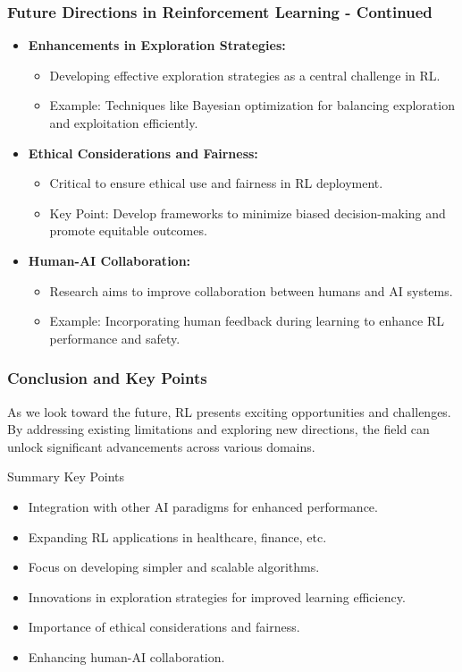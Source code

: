 \documentclass[aspectratio=169]{beamer}
\begin{document}
\begin{frame}[fragile]
    \frametitle{Future Directions in Reinforcement Learning - Continued}
    \begin{itemize}
        \item \textbf{Enhancements in Exploration Strategies:}
        \begin{itemize}
            \item Developing effective exploration strategies as a central challenge in RL.
            \item Example: Techniques like Bayesian optimization for balancing exploration and exploitation efficiently.
        \end{itemize}

        \item \textbf{Ethical Considerations and Fairness:}
        \begin{itemize}
            \item Critical to ensure ethical use and fairness in RL deployment.
            \item Key Point: Develop frameworks to minimize biased decision-making and promote equitable outcomes.
        \end{itemize}

        \item \textbf{Human-AI Collaboration:}
        \begin{itemize}
            \item Research aims to improve collaboration between humans and AI systems.
            \item Example: Incorporating human feedback during learning to enhance RL performance and safety.
        \end{itemize}
    \end{itemize}
\end{frame}

\begin{frame}[fragile]
    \frametitle{Conclusion and Key Points}
    As we look toward the future, RL presents exciting opportunities and challenges. By addressing existing limitations and exploring new directions, the field can unlock significant advancements across various domains.

    \begin{block}{Summary Key Points}
        \begin{itemize}
            \item Integration with other AI paradigms for enhanced performance.
            \item Expanding RL applications in healthcare, finance, etc.
            \item Focus on developing simpler and scalable algorithms.
            \item Innovations in exploration strategies for improved learning efficiency.
            \item Importance of ethical considerations and fairness.
            \item Enhancing human-AI collaboration.
        \end{itemize}
    \end{block}
\end{frame}
\end{document}
